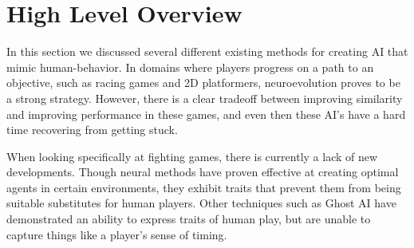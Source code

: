 \section{High Level Overview}
In this section we discussed several different existing methods for creating AI that mimic human-behavior. In domains where players progress on a path to an objective, such as racing games and 2D platformers, neuroevolution proves to be a strong strategy. However, there is a clear tradeoff between improving similarity and improving performance in these games, and even then these AI's have a hard time recovering from getting stuck. 

When looking specifically at fighting games, there is currently a lack of new developments. Though neural methods have proven effective at creating optimal agents in certain environments, they exhibit traits that prevent them from being suitable substitutes for human players. Other techniques such as Ghost AI have demonstrated an ability to express traits of human play, but are unable to capture things like a player's sense of timing. 